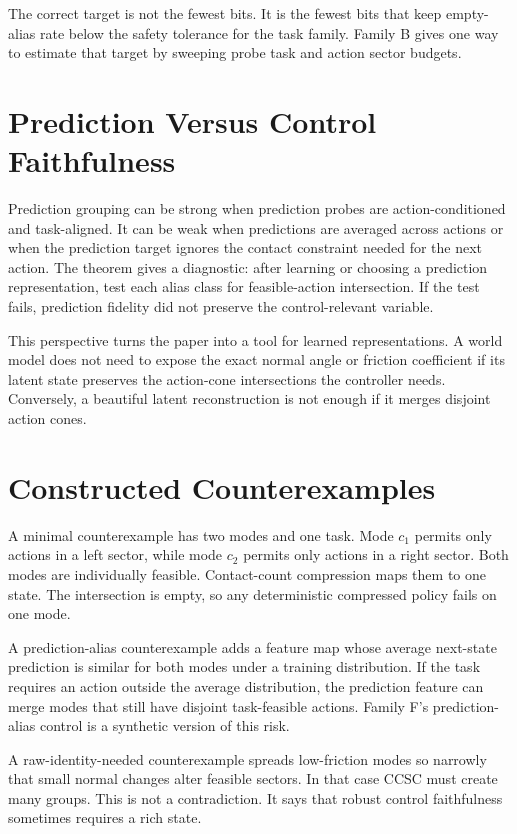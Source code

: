 \documentclass{article}
\begin{document}
The correct target is not the fewest bits. It is the fewest bits that keep empty-alias rate below the safety tolerance for the task family. Family B gives one way to estimate that target by sweeping probe task and action sector budgets.

\section{Prediction Versus Control Faithfulness}
Prediction grouping can be strong when prediction probes are action-conditioned and task-aligned. It can be weak when predictions are averaged across actions or when the prediction target ignores the contact constraint needed for the next action. The theorem gives a diagnostic: after learning or choosing a prediction representation, test each alias class for feasible-action intersection. If the test fails, prediction fidelity did not preserve the control-relevant variable.

This perspective turns the paper into a tool for learned representations. A world model does not need to expose the exact normal angle or friction coefficient if its latent state preserves the action-cone intersections the controller needs. Conversely, a beautiful latent reconstruction is not enough if it merges disjoint action cones.

\section{Constructed Counterexamples}
A minimal counterexample has two modes and one task. Mode $c_1$ permits only actions in a left sector, while mode $c_2$ permits only actions in a right sector. Both modes are individually feasible. Contact-count compression maps them to one state. The intersection is empty, so any deterministic compressed policy fails on one mode.

A prediction-alias counterexample adds a feature map whose average next-state prediction is similar for both modes under a training distribution. If the task requires an action outside the average distribution, the prediction feature can merge modes that still have disjoint task-feasible actions. Family F's prediction-alias control is a synthetic version of this risk.

A raw-identity-needed counterexample spreads low-friction modes so narrowly that small normal changes alter feasible sectors. In that case CCSC must create many groups. This is not a contradiction. It says that robust control faithfulness sometimes requires a rich state.
\end{document}
